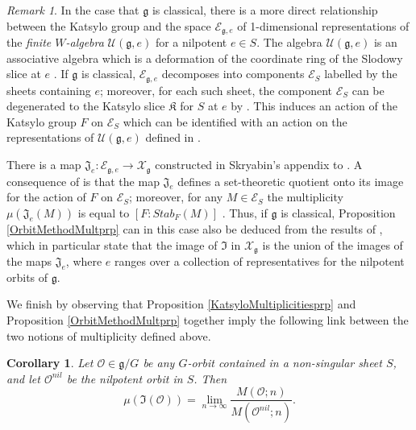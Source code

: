 \documentclass{amsart}
\newtheorem{corollary}[theorem]{Corollary}
\theoremstyle{remark}
\newtheorem{remark}[theorem]{Remark}
\numberwithin{theorem}{section}
\numberwithin{equation}{section}
\begin{document}
\begin{remark}\label{Walgebrasrmk}
In the case that $\mathfrak{g}$ is classical, there is a more direct relationship between the Katsylo group and the space $\mathscr{E}_{\mathfrak{g},e}$ of 1-dimensional representations of the \emph{finite $W$-algebra} $\mathcal U(\mathfrak{g},e)$ for a nilpotent $e \in S$. The algebra $\mathcal U(\mathfrak{g},e)$ is an associative algebra which is a deformation of the coordinate ring of the Slodowy slice at $e$ \cite{Premet1}. If $\mathfrak{g}$ is classical, $\mathscr{E}_{\mathfrak{g},e}$ decomposes into components $\mathscr{E}_{S}$ labelled by the sheets containing $e$; moreover, for each such sheet, the component $\mathscr{E}_S$ can be degenerated to the Katsylo slice $\mathfrak{K}$ for $S$ at $e$ by \cite[Theorem 1.1]{Topley}. This induces an action of the Katsylo group $F$ on $\mathscr{E}_{S}$ which can be identified with an action on the representations of $\mathcal U(\mathfrak{g},e)$ defined in \cite[Section 4.9]{Premet3}.

There is a map $\mathfrak{J}_e:\mathscr E_{\mathfrak{g},e} \rightarrow \mathscr X_{\mathfrak{g}}$ constructed in Skryabin's appendix to \cite{Premet1}. A consequence of \cite[Theorem 1.2.2]{Losev3} is that the map $\mathfrak{J}_e$ defines a set-theoretic quotient onto its image for the action of $F$ on $\mathscr E_{S}$; moreover, for any $M \in \mathscr E_S$ the multiplicity $\mu(\mathfrak{J}_e(M))$ is equal to $[F:Stab_F(M)]$ \cite[Theorem 3.1.1]{Losev3}. Thus, if $\mathfrak{g}$ is classical, Proposition \ref{OrbitMethodMultprp} can in this case also be deduced from the results of \cite[Section 9]{Topley}, which in particular state that the image of $\mathfrak{I}$ in $\mathscr X_{\mathfrak{g}}$ is the union of the images of the maps $\mathfrak{J}_e$, where $e$ ranges over a collection of representatives for the nilpotent orbits of $\mathfrak{g}$.
\end{remark}

We finish by observing that Proposition \ref{KatsyloMultiplicitiesprp} and Proposition \ref{OrbitMethodMultprp} together imply the following link between the two notions of multiplicity defined above.

\begin{corollary}\label{QCMultiplicitiescor}
    Let $\mathcal O \in \mathfrak{g}/G$ be any $G$-orbit contained in a non-singular sheet $S$, and let $\mathcal O^{nil}$ be the nilpotent orbit in $S$. Then 
    \begin{equation}\label{QCMultiplicitieseqn}
        \mu(\mathfrak{I}(\mathcal O)) = \lim_{n \rightarrow\infty} \frac{M(\mathcal O;n)}{M(\mathcal O^{nil};n)}.
    \end{equation}
\end{corollary}
\end{document}
